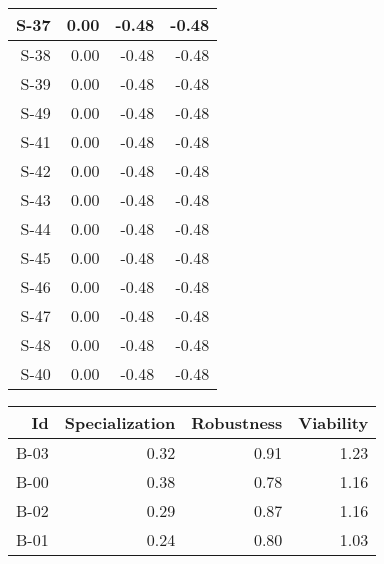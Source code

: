 \begin{tabular}{ | r | r | r | r | }
    \hline
                  S-37  &            0.00  &           -0.48  &           -0.48  \\
    \hline
                  S-38  &            0.00  &           -0.48  &           -0.48  \\
    \hline
                  S-39  &            0.00  &           -0.48  &           -0.48  \\
    \hline
                  S-49  &            0.00  &           -0.48  &           -0.48  \\
    \hline
                  S-41  &            0.00  &           -0.48  &           -0.48  \\
    \hline
                  S-42  &            0.00  &           -0.48  &           -0.48  \\
    \hline
                  S-43  &            0.00  &           -0.48  &           -0.48  \\
    \hline
                  S-44  &            0.00  &           -0.48  &           -0.48  \\
    \hline
                  S-45  &            0.00  &           -0.48  &           -0.48  \\
    \hline
                  S-46  &            0.00  &           -0.48  &           -0.48  \\
    \hline
                  S-47  &            0.00  &           -0.48  &           -0.48  \\
    \hline
                  S-48  &            0.00  &           -0.48  &           -0.48  \\
    \hline
                  S-40  &            0.00  &           -0.48  &           -0.48  \\
    \hline
\end{tabular}


\begin{tabular}{ | r | r | r | r | }
    \hline
                    Id  &  Specialization  &      Robustness  &       Viability  \\
    \hline
    \hline
                  B-03  &            0.32  &            0.91  &            1.23  \\
    \hline
                  B-00  &            0.38  &            0.78  &            1.16  \\
    \hline
                  B-02  &            0.29  &            0.87  &            1.16  \\
    \hline
                  B-01  &            0.24  &            0.80  &            1.03  \\
    \hline
\end{tabular}


